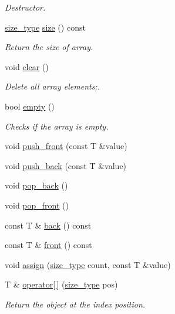 \begin{DoxyCompactItemize}
\begin{DoxyCompactList}\small\item\em Destructor. \end{DoxyCompactList}\item 
\hyperlink{classsc_1_1vector_aa4500ebad5be45f8d469fc4b5d62b19d}{size\+\_\+type} \hyperlink{classsc_1_1vector_a1a2113e8d3d4c1494a929d55237d6dde}{size} () const
\begin{DoxyCompactList}\small\item\em Return the size of array. \end{DoxyCompactList}\item 
void \hyperlink{classsc_1_1vector_a17c6d622cf64278d03feac9c38fa3684}{clear} ()
\begin{DoxyCompactList}\small\item\em Delete all array elements;. \end{DoxyCompactList}\item 
bool \hyperlink{classsc_1_1vector_a74d59d93240b308c7b4409af489bc3c5}{empty} ()
\begin{DoxyCompactList}\small\item\em Checks if the array is empty. \end{DoxyCompactList}\item 
void \hyperlink{classsc_1_1vector_a013daac15aada32590d4372c0cbc610a}{push\+\_\+front} (const T \&value)
\item 
void \hyperlink{classsc_1_1vector_a5b4a8c72d19d0bdab794e495fb1e334d}{push\+\_\+back} (const T \&value)
\item 
void \hyperlink{classsc_1_1vector_a3dbc8155ac3737f9a9ffe7f454a8f321}{pop\+\_\+back} ()
\item 
void \hyperlink{classsc_1_1vector_aad4717b5827454557f7c9e5c3edd5a7e}{pop\+\_\+front} ()
\item 
const T \& \hyperlink{classsc_1_1vector_a90e25706d3a6e4b72db0f5ad35a63abf}{back} () const
\item 
const T \& \hyperlink{classsc_1_1vector_a85da6164a082030bd04de354d657da0d}{front} () const
\item 
void \hyperlink{classsc_1_1vector_aaa1279dfc147a016a70a65faa7d89c23}{assign} (\hyperlink{classsc_1_1vector_aa4500ebad5be45f8d469fc4b5d62b19d}{size\+\_\+type} count, const T \&value)
\item 
T \& \hyperlink{classsc_1_1vector_ab93846461528695f38e1d143231b0653}{operator\mbox{[}$\,$\mbox{]}} (\hyperlink{classsc_1_1vector_aa4500ebad5be45f8d469fc4b5d62b19d}{size\+\_\+type} pos)
\begin{DoxyCompactList}\small\item\em Return the object at the index position. \end{DoxyCompactList}\item 

\end{DoxyCompactItemize}
